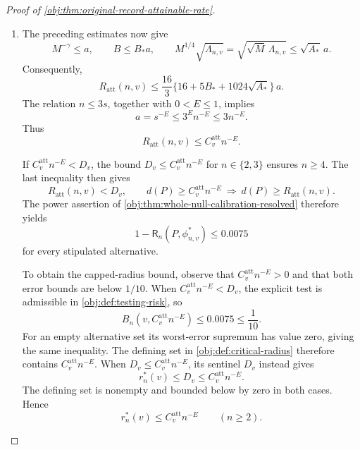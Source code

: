 \documentclass[11pt]{article}
\begin{document}
\begin{proof}[Proof of \cref{obj:thm:original-record-attainable-rate}]
\begin{enumerate}
For the second noise channel, direct algebra gives
\[
2+t=\frac1q,
\qquad
2S+1+\beta t+\frac{S}{2\gamma}=D_p,
\]
and hence
\[
E_4\left(2+\frac{1+\beta t}{S}+\frac{1}{2\gamma}\right)=2.
\]
Using \(E\le E_4\), we obtain
\[
\frac{a^{-1/(2\gamma)}a^{-(1+\beta t)/S}}{s^2}
=s^{E(1/(2\gamma)+(1+\beta t)/S)-2}
\le s^{-2E}=a^2.
\]
Combining this with the tail-channel balance gives
\[
\sqrt M\,\frac{2L_2^2}{s(s-1)}
\le\sqrt2\{16384+256G_*^2\}a^2.
\]
Adding the bound \(\sqrt M\,L_1^2/s\le\sqrt2\,64L_*^2a^2\) therefore proves
\[
\begin{aligned}
\sqrt M\,\Lambda_{n,v}
&=\sqrt M\left\{\frac{L_1^2}{s}
                 +\frac{2L_2^2}{s(s-1)}\right\}\\
&\le\sqrt2\{64L_*^2+16384+256G_*^2\}a^2\\
&\le A_*a^2.
\end{aligned}
\]
This includes \(L=0\), since all the increment sums then vanish. Together with the single-cutoff bound \(\sqrt M\,\Lambda_{n,v}\le24576\sqrt2\,a^2\le A_*a^2\), the covariance estimate holds in both branches.

\item The preceding estimates now give
\[
M^{-\gamma}\le a,\qquad
B\le B_*a,\qquad
M^{1/4}\sqrt{\Lambda_{n,v}}
=\sqrt{\sqrt M\,\Lambda_{n,v}}
\le\sqrt{A_*}\,a.
\]
Consequently,
\[
R_{\mathrm{att}}(n,v)
\le\frac{16}{3}
\{16+5B_*+1024\sqrt{A_*}\}\,a.
\]
The relation \(n\le3s\), together with \(0<E\le1\), implies
\[
a=s^{-E}\le3^E n^{-E}\le3n^{-E}.
\]
Thus
\[
R_{\mathrm{att}}(n,v)\le C^{\mathrm{att}}_v n^{-E}.
\]

If \(C^{\mathrm{att}}_v n^{-E}<D_v\), the bound \(D_v\le C^{\mathrm{att}}_v n^{-E}\) for \(n\in\{2,3\}\) ensures \(n\ge4\). The last inequality then gives
\[
R_{\mathrm{att}}(n,v)<D_v,\qquad
d(P)\ge C^{\mathrm{att}}_v n^{-E}
\ \Longrightarrow\
d(P)\ge R_{\mathrm{att}}(n,v).
\]
The power assertion of
\cref{obj:thm:whole-null-calibration-resolved} therefore yields
\[
1-\mathsf R_n(P,\phi^*_{n,v})\le0.0075
\]
for every stipulated alternative.

To obtain the capped-radius bound, observe that
\(C^{\mathrm{att}}_v n^{-E}>0\) and that both error bounds are below \(1/10\).
When \(C^{\mathrm{att}}_v n^{-E}<D_v\), the explicit test is admissible in
\cref{obj:def:testing-risk}, so
\[
B_n\!\left(v,C^{\mathrm{att}}_v n^{-E}\right)
\le0.0075\le\frac1{10}.
\]
For an empty alternative set its worst-error supremum has value zero, giving the same inequality. The defining set in
\cref{obj:def:critical-radius} therefore contains
\(C^{\mathrm{att}}_v n^{-E}\).
When \(D_v\le C^{\mathrm{att}}_v n^{-E}\), its sentinel \(D_v\) instead gives
\[
r_n^*(v)\le D_v\le C^{\mathrm{att}}_v n^{-E}.
\]
The defining set is nonempty and bounded below by zero in both cases. Hence
\[
r_n^*(v)\le C^{\mathrm{att}}_v n^{-E}
\qquad(n\ge2).
\]


\end{enumerate}
\end{proof}
\end{document}
